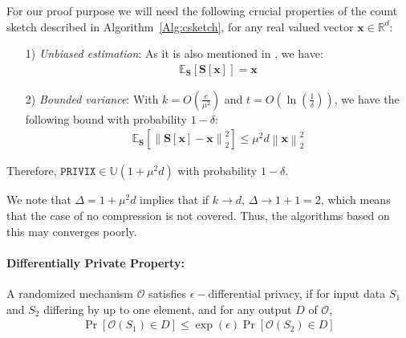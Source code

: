\begin{property}
For our proof purpose we will need the following crucial properties of the count sketch described in Algorithm~\ref{Alg:csketch}, for any real valued vector $\mathbf{x}\in \mathbb{R}^{d}$:
\begin{itemize}
    \item[1)] \emph{Unbiased estimation}: As it is also mentioned in \cite{li2019privacy}, we have:
    \begin{align}
        \mathbb{E}_{\mathbf{S}}\left[\mathbf{S}\left[\mathbf{x}\right]\right]=\mathbf{x}
    \end{align}
    
    \item[2)] \emph{Bounded variance}: With $k=O\left(\frac{e}{\mu^2}\right)$ and $t=O\left(\ln \left(\frac{1}{\delta}\right)\right)$, we have the following bound with probability $1-\delta$:
    \begin{align}
        \mathbb{E}_{\mathbf{S}}\left[\left\|\mathbf{S}\left[\mathbf{x}\right]-\mathbf{x}\right\|_2^2\right]\leq \mu^2 d\left\|\mathbf{x}\right\|_2^2
    \end{align}
\end{itemize}
\end{property}
Therefore, $\texttt{PRIVIX}\in \mathbb{U}(1+\mu^2 d)$ with probability $1-\delta$.
\begin{remark}
We note that $\Delta=1+\mu^2d$ implies that if $k\rightarrow d$, $\Delta\rightarrow 1+1=2$, which means that the case of no compression is not covered. Thus, the algorithms based on this may converges poorly.
\end{remark}

\paragraph{Differentially Private Property:}
\begin{definition}
A randomized mechanism $\mathcal{O}$ satisfies $\epsilon-$differential privacy, if for input data ${S}_1$ and ${S}_2$ differing by up to one element, and for any output $D$ of $\mathcal{O}$,
\begin{align}
    \Pr\left[\mathcal{O}(S_1)\in D\right]\leq \exp{\left(\epsilon\right)}\Pr\left[\mathcal{O}(S_2)\in D\right] 
\end{align}
\end{definition}

